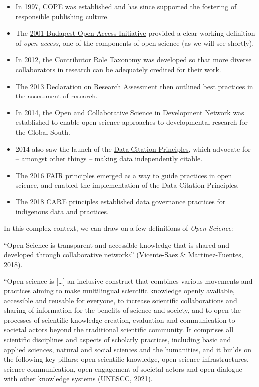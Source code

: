 \documentclass[
  letterpaper,
  DIV=11,
  numbers=noendperiod]{scrreport}
\providecommand{\tightlist}{%
  \setlength{\itemsep}{0pt}\setlength{\parskip}{0pt}}\usepackage{longtable,booktabs,array}
\begin{document}
\begin{itemize}
\tightlist
\item
  In 1997,
  \href{https://publicationethics.org/about/our-organisation}{COPE was
  established} and has since supported the fostering of responsible
  publishing culture.
\item
  The \href{https://www.budapestopenaccessinitiative.org}{2001 Budapest
  Open Access Initiative} provided a clear working definition of
  \emph{open access}, one of the components of open science (as we will
  see shortly).
\item
  In 2012, the \href{https://credit.niso.org}{Contributor Role Taxonomy}
  was developed so that more diverse collaborators in research can be
  adequately credited for their work.
\item
  The \href{http://doi.org/10.1242/dmm.012955}{2013 Declaration on
  Research Assessment} then outlined best practices in the assessment of
  research.
\item
  In 2014, the \href{https://ocsdnet.org/about-ocsdnet/}{Open and
  Collaborative Science in Development Network} was established to
  enable open science approaches to developmental research for the
  Global South.
\item
  2014 also saw the launch of the
  \href{https://force11.org/info/joint-declaration-of-data-citation-principles-final/}{Data
  Citation Principles}, which advocate for -- amongst other things --
  making data independently citable.
\item
  The \href{https://www.go-fair.org/fair-principles/}{2016 FAIR
  principles} emerged as a way to guide practices in open science, and
  enabled the implementation of the Data Citation Principles.
\item
  The \href{https://www.gida-global.org/care}{2018 CARE principles}
  established data governance practices for indigenous data and
  practices.
\end{itemize}

In this complex context, we can draw on a few definitions of \emph{Open
Science}:

``Open Science is transparent and accessible knowledge that is shared
and developed through collaborative networks'' (Vicente-Saez \&
Martinez-Fuentes,
\href{https://doi.org/10.1016/j.jbusres.2017.12.043}{2018}).

``Open science is {[}\ldots{]} an inclusive construct that combines
various movements and practices aiming to make multilingual scientific
knowledge openly available, accessible and reusable for everyone, to
increase scientific collaborations and sharing of information for the
benefits of science and society, and to open the processes of scientific
knowledge creation, evaluation and communication to societal actors
beyond the traditional scientific community. It comprises all scientific
disciplines and aspects of scholarly practices, including basic and
applied sciences, natural and social sciences and the humanities, and it
builds on the following key pillars: open scientific knowledge, open
science infrastructures, science communication, open engagement of
societal actors and open dialogue with other knowledge systems (UNESCO,
\href{https://unesdoc.unesco.org/ark:/48223/pf0000379949.locale=en}{2021}).
\end{document}
